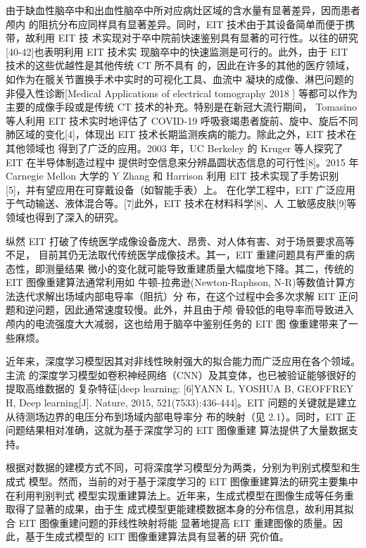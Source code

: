   由于缺血性脑卒中和出血性脑卒中所对应病灶区域的含水量有显著差异，因而患者颅内
  的阻抗分布应同样具有显著差异。同时，EIT 技术由于其设备简单而便于携带，故利用 EIT 技
  术实现对于卒中院前快速鉴别具有显著的可行性。以往的研究[40-42]也表明利用 EIT 技术实
  现脑卒中的快速监测是可行的。此外，由于 EIT 技术的这些优越性是其他传统 CT 所不具有
  的，因此在许多的其他的医疗领域，如作为在髋关节置换手术中实时的可视化工具、血流中
  凝块的成像、淋巴问题的非侵入性诊断[Medical Applications of electrical tomography 2018 ]
  等都可以作为主要的成像手段或是传统 CT 技术的补充。特别是在新冠大流行期间，
  Tomasino 等人利用 EIT 技术实时地评估了 COVID-19 呼吸衰竭患者旋前、旋中、旋后不同
  肺区域的变化[4]，体现出 EIT 技术长期监测疾病的能力。除此之外，EIT 技术在其他领域也
  得到了广泛的应用。2003 年，UC Berkeley 的 Kruger 等人探究了 EIT 在半导体制造过程中
  提供时空信息来分辨晶圆状态信息的可行性[8]。2015 年 Carnegie Mellon 大学的 Y Zhang 和
  Harrison 利用 EIT 技术实现了手势识别 [5]，并有望应用在可穿戴设备（如智能手表）上。
  在化学工程中，EIT 广泛应用于气动输送、液体混合等。[7]此外，EIT 技术在材料科学[8]、人
  工敏感皮肤[9]等领域也得到了深入的研究。
  
  纵然 EIT 打破了传统医学成像设备庞大、昂贵、对人体有害、对于场景要求高等不足，
目前其仍无法取代传统医学成像技术。其一，EIT 重建问题具有严重的病态性，即测量结果
微小的变化就可能导致重建质量大幅度地下降。其二，传统的 EIT 图像重建算法通常利用如
牛顿-拉弗逊(Newton-Raphson, N-R)等数值计算方法迭代求解出场域内部电导率（阻抗）分
布，在这个过程中会多次求解 EIT 正问题和逆问题，因此通常速度较慢。此外，并且由于颅
骨较低的电导率而导致进入颅内的电流强度大大减弱，这也给用于脑卒中鉴别任务的 EIT 图
像重建带来了一些麻烦。


近年来，深度学习模型因其对非线性映射强大的拟合能力而广泛应用在各个领域。主流
的深度学习模型如卷积神经网络（CNN）及其变体，也已被验证能够很好的提取高维数据的
复杂特征[deep learning: [6]YANN L, YOSHUA B, GEOFFREY H, Deep learning[J]. Nature, 2015,
521(7533):436-444]。EIT 问题的关键就是建立从待测场边界的电压分布到场域内部电导率分
布的映射（见 2.1）。同时，EIT 正问题结果相对准确，这就为基于深度学习的 EIT 图像重建
算法提供了大量数据支持。


根据对数据的建模方式不同，可将深度学习模型分为两类，分别为判别式模型和生成式
模型。然而，当前的对于基于深度学习的 EIT 图像重建算法的研究主要集中在利用判别判式
模型实现重建算法上。近年来，生成式模型在图像生成等任务重取得了显著的成果，由于生
成式模型更能建模数据本身的分布信息，故利用其拟合 EIT 图像重建问题的菲线性映射将能
显著地提高 EIT 重建图像的质量。因此，基于生成式模型的 EIT 图像重建算法具有显著的研
究价值。

